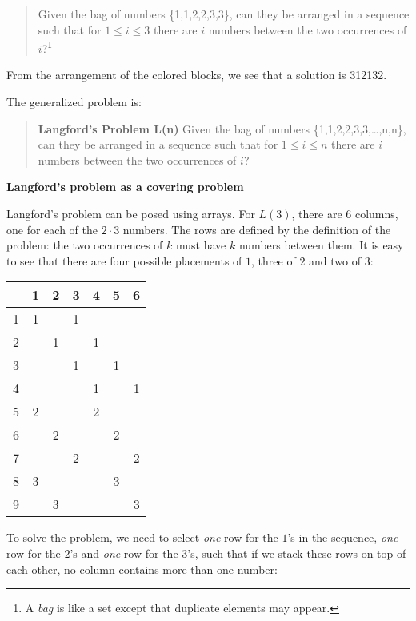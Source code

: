 \documentclass[11pt,a4paper]{report}
\begin{document}
\begin{quote}
Given the bag of numbers \{1,1,2,2,3,3\}, can they be arranged in a sequence such that for $1\leq i \leq 3$ there are $i$ numbers between the two occurrences of $i$?\footnote{A \emph{bag} is like a set except that duplicate elements may appear.}
\end{quote}

From the arrangement of the colored blocks, we see that a solution is 312132.

The generalized problem is:
\begin{quote}
\textbf{Langford's Problem L(n)} Given the bag of numbers \{1,1,2,2,3,3,\ldots,n,n\}, can they be arranged in a sequence such that for $1\leq i \leq n$ there are $i$ numbers between the two occurrences of $i$?
\end{quote}

\bigskip

\begin{center}
\textbf{\Large Langford's problem as a covering problem}
\end{center}


Langford's problem can be posed using arrays. For $L(3)$, there are $6$ columns, one for each of the $2\cdot 3$ numbers. The rows are defined by the definition of the problem: the two occurrences of $k$ must have $k$ numbers between them. It is easy to see that there are four possible placements of $1$, three of $2$ and two of $3$:

\begin{center}
\begin{tabular}{|c||c|c|c|c|c|c|}
\hline
&1&2&3&4&5&6\\\hline\hline
1&1&&1&&&\\\hline
2&&1&&1&&\\\hline
3&&&1&&1&\\\hline
4&&&&1&&1\\\hline
5&2&&&2&&\\\hline
6&&2&&&2&\\\hline
7&&&2&&&2\\\hline
8&3&&&&3&\\\hline
9&&3&&&&3\\\hline
\end{tabular}
\end{center}

To solve the problem, we need to select \emph{one} row for the $1$'s in the sequence, \emph{one} row for the $2$'s and \emph{one} row for the $3$'s, such that if we stack these rows on top of each other, no column contains more than one number:
\end{document}
